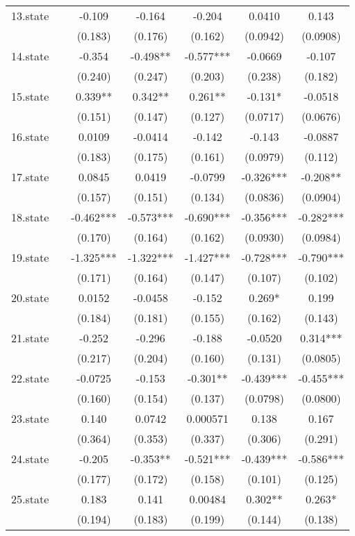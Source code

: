 \documentclass[]{article}
\begin{document}
\begin{tabular}{lcccccc}
13.state &  & -0.109 & -0.164 & -0.204 & 0.0410 & 0.143 \\
 &  & (0.183) & (0.176) & (0.162) & (0.0942) & (0.0908) \\
14.state &  & -0.354 & -0.498** & -0.577*** & -0.0669 & -0.107 \\
 &  & (0.240) & (0.247) & (0.203) & (0.238) & (0.182) \\
15.state &  & 0.339** & 0.342** & 0.261** & -0.131* & -0.0518 \\
 &  & (0.151) & (0.147) & (0.127) & (0.0717) & (0.0676) \\
16.state &  & 0.0109 & -0.0414 & -0.142 & -0.143 & -0.0887 \\
 &  & (0.183) & (0.175) & (0.161) & (0.0979) & (0.112) \\
17.state &  & 0.0845 & 0.0419 & -0.0799 & -0.326*** & -0.208** \\
 &  & (0.157) & (0.151) & (0.134) & (0.0836) & (0.0904) \\
18.state &  & -0.462*** & -0.573*** & -0.690*** & -0.356*** & -0.282*** \\
 &  & (0.170) & (0.164) & (0.162) & (0.0930) & (0.0984) \\
19.state &  & -1.325*** & -1.322*** & -1.427*** & -0.728*** & -0.790*** \\
 &  & (0.171) & (0.164) & (0.147) & (0.107) & (0.102) \\
20.state &  & 0.0152 & -0.0458 & -0.152 & 0.269* & 0.199 \\
 &  & (0.184) & (0.181) & (0.155) & (0.162) & (0.143) \\
21.state &  & -0.252 & -0.296 & -0.188 & -0.0520 & 0.314*** \\
 &  & (0.217) & (0.204) & (0.160) & (0.131) & (0.0805) \\
22.state &  & -0.0725 & -0.153 & -0.301** & -0.439*** & -0.455*** \\
 &  & (0.160) & (0.154) & (0.137) & (0.0798) & (0.0800) \\
23.state &  & 0.140 & 0.0742 & 0.000571 & 0.138 & 0.167 \\
 &  & (0.364) & (0.353) & (0.337) & (0.306) & (0.291) \\
24.state &  & -0.205 & -0.353** & -0.521*** & -0.439*** & -0.586*** \\
 &  & (0.177) & (0.172) & (0.158) & (0.101) & (0.125) \\
25.state &  & 0.183 & 0.141 & 0.00484 & 0.302** & 0.263* \\
 &  & (0.194) & (0.183) & (0.199) & (0.144) & (0.138) \\

\end{tabular}
\end{document}
